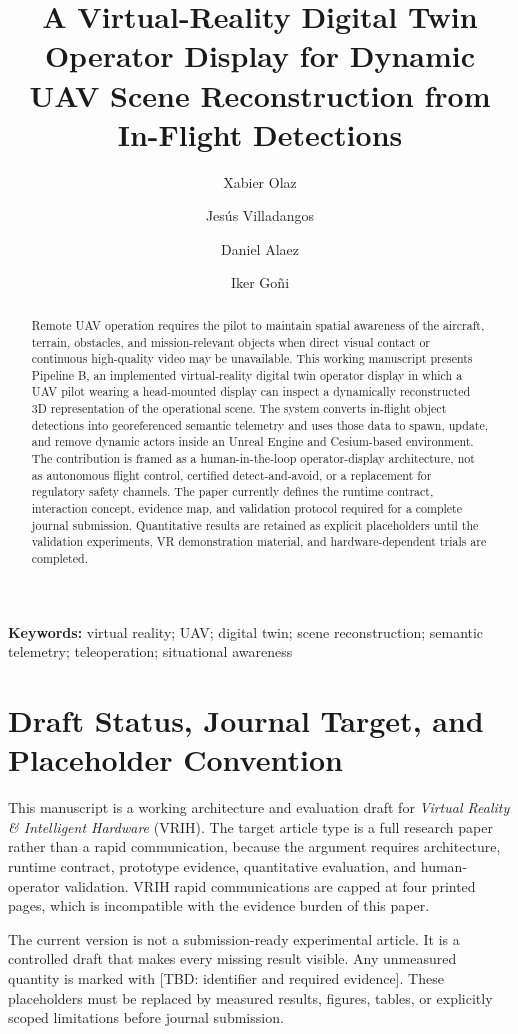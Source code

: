 \documentclass[11pt,a4paper]{article}
\title{A Virtual-Reality Digital Twin Operator Display for Dynamic UAV Scene Reconstruction from In-Flight Detections}
\author{Xabier Olaz \and Jes\'us Villadangos \and Daniel Alaez \and Iker Go\~ni}
\date{}
\newcommand{\tbd}[1]{\textcolor{publicationred}{[TBD: #1]}}
\begin{document}
\maketitle

\begin{abstract}
Remote UAV operation requires the pilot to maintain spatial awareness of the aircraft, terrain, obstacles, and mission-relevant objects when direct visual contact or continuous high-quality video may be unavailable. This working manuscript presents Pipeline B, an implemented virtual-reality digital twin operator display in which a UAV pilot wearing a head-mounted display can inspect a dynamically reconstructed 3D representation of the operational scene. The system converts in-flight object detections into georeferenced semantic telemetry and uses those data to spawn, update, and remove dynamic actors inside an Unreal Engine and Cesium-based environment. The contribution is framed as a human-in-the-loop operator-display architecture, not as autonomous flight control, certified detect-and-avoid, or a replacement for regulatory safety channels. The paper currently defines the runtime contract, interaction concept, evidence map, and validation protocol required for a complete journal submission. Quantitative results are retained as explicit placeholders until the validation experiments, VR demonstration material, and hardware-dependent trials are completed.
\end{abstract}

\noindent\textbf{Keywords:} virtual reality; UAV; digital twin; scene reconstruction; semantic telemetry; teleoperation; situational awareness

\section{Draft Status, Journal Target, and Placeholder Convention}

This manuscript is a working architecture and evaluation draft for \emph{Virtual Reality \& Intelligent Hardware} (VRIH). The target article type is a full research paper rather than a rapid communication, because the argument requires architecture, runtime contract, prototype evidence, quantitative evaluation, and human-operator validation. VRIH rapid communications are capped at four printed pages, which is incompatible with the evidence burden of this paper.

The current version is not a submission-ready experimental article. It is a controlled draft that makes every missing result visible. Any unmeasured quantity is marked with \tbd{identifier and required evidence}. These placeholders must be replaced by measured results, figures, tables, or explicitly scoped limitations before journal submission.
\end{document}
